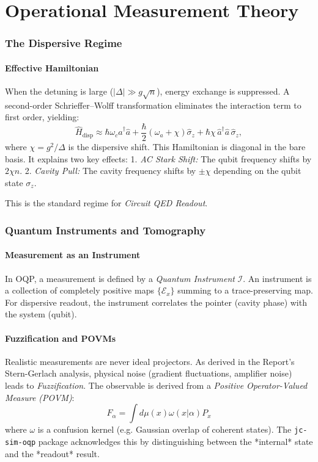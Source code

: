 \documentclass[11pt,a4paper]{article}
\newcommand{\hc}{\hat{a}}
\newcommand{\hcd}{\hat{a}^\dagger}
\newcommand{\sigmaz}{\hat{\sigma}_z}
\newcommand{\Hdisp}{\hat{H}_{\text{disp}}}
\theoremstyle{definition}
\begin{document}
\part{Operational Measurement Theory}

\section{The Dispersive Regime}
\label{sec:dispersive}

\subsection{Effective Hamiltonian}
When the detuning is large ($|\Delta| \gg g\sqrt{n}$), energy exchange is suppressed.
A second-order Schrieffer--Wolff transformation eliminates the interaction term to first order, yielding:
\begin{equation}
  \Hdisp \approx \hbar\omega_c \hcd \hc + \frac{\hbar}{2}(\omega_a + \chi)\sigmaz + \hbar\chi\,\hcd\hc\,\sigmaz,
\end{equation}
where $\chi = g^2/\Delta$ is the dispersive shift.
This Hamiltonian is diagonal in the bare basis. It explains two key effects:
1.  \emph{AC Stark Shift:} The qubit frequency shifts by $2\chi n$.
2.  \emph{Cavity Pull:} The cavity frequency shifts by $\pm \chi$ depending on the qubit state $\sigma_z$.

This is the standard regime for \emph{Circuit QED Readout}.

\section{Quantum Instruments and Tomography}
\label{sec:instruments}

\subsection{Measurement as an Instrument}
In OQP, a measurement is defined by a \emph{Quantum Instrument} $\mathcal{I}$.
An instrument is a collection of completely positive maps $\{\mathcal{E}_x\}$ summing to a trace-preserving map.
For dispersive readout, the instrument correlates the pointer (cavity phase) with the system (qubit).

\subsection{Fuzzification and POVMs}
Realistic measurements are never ideal projectors. As derived in the Report's Stern-Gerlach analysis, physical noise (gradient fluctuations, amplifier noise) leads to \emph{Fuzzification}.
The observable is derived from a \emph{Positive Operator-Valued Measure (POVM)}:
\begin{equation}
    F_\alpha = \int d\mu(x) \omega(x|\alpha) P_x
\end{equation}
where $\omega$ is a confusion kernel (e.g. Gaussian overlap of coherent states).
The \texttt{jc-sim-oqp} package acknowledges this by distinguishing between the *internal* state and the *readout* result.
\end{document}
